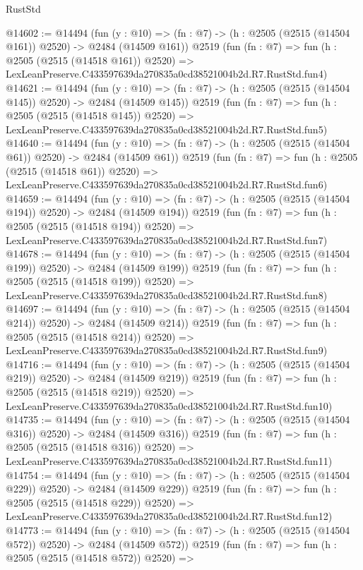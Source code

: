 \begin{lexlean}{RustStd}
\begin{coremodule}
@14602 := @14494
    (fun (y : @10) => (fn : @7) -> (h : @2505 (@2515 (@14504 @161)) @2520) -> @2484 (@14509 @161))
    @2519
    (fun (fn : @7) =>
    fun (h : @2505 (@2515 (@14518 @161)) @2520) =>
    LexLeanPreserve.C433597639da270835a0cd38521004b2d.R7.RustStd.fun4)
@14621 := @14494
    (fun (y : @10) => (fn : @7) -> (h : @2505 (@2515 (@14504 @145)) @2520) -> @2484 (@14509 @145))
    @2519
    (fun (fn : @7) =>
    fun (h : @2505 (@2515 (@14518 @145)) @2520) =>
    LexLeanPreserve.C433597639da270835a0cd38521004b2d.R7.RustStd.fun5)
@14640 := @14494
    (fun (y : @10) => (fn : @7) -> (h : @2505 (@2515 (@14504 @61)) @2520) -> @2484 (@14509 @61))
    @2519
    (fun (fn : @7) =>
    fun (h : @2505 (@2515 (@14518 @61)) @2520) =>
    LexLeanPreserve.C433597639da270835a0cd38521004b2d.R7.RustStd.fun6)
@14659 := @14494
    (fun (y : @10) => (fn : @7) -> (h : @2505 (@2515 (@14504 @194)) @2520) -> @2484 (@14509 @194))
    @2519
    (fun (fn : @7) =>
    fun (h : @2505 (@2515 (@14518 @194)) @2520) =>
    LexLeanPreserve.C433597639da270835a0cd38521004b2d.R7.RustStd.fun7)
@14678 := @14494
    (fun (y : @10) => (fn : @7) -> (h : @2505 (@2515 (@14504 @199)) @2520) -> @2484 (@14509 @199))
    @2519
    (fun (fn : @7) =>
    fun (h : @2505 (@2515 (@14518 @199)) @2520) =>
    LexLeanPreserve.C433597639da270835a0cd38521004b2d.R7.RustStd.fun8)
@14697 := @14494
    (fun (y : @10) => (fn : @7) -> (h : @2505 (@2515 (@14504 @214)) @2520) -> @2484 (@14509 @214))
    @2519
    (fun (fn : @7) =>
    fun (h : @2505 (@2515 (@14518 @214)) @2520) =>
    LexLeanPreserve.C433597639da270835a0cd38521004b2d.R7.RustStd.fun9)
@14716 := @14494
    (fun (y : @10) => (fn : @7) -> (h : @2505 (@2515 (@14504 @219)) @2520) -> @2484 (@14509 @219))
    @2519
    (fun (fn : @7) =>
    fun (h : @2505 (@2515 (@14518 @219)) @2520) =>
    LexLeanPreserve.C433597639da270835a0cd38521004b2d.R7.RustStd.fun10)
@14735 := @14494
    (fun (y : @10) => (fn : @7) -> (h : @2505 (@2515 (@14504 @316)) @2520) -> @2484 (@14509 @316))
    @2519
    (fun (fn : @7) =>
    fun (h : @2505 (@2515 (@14518 @316)) @2520) =>
    LexLeanPreserve.C433597639da270835a0cd38521004b2d.R7.RustStd.fun11)
@14754 := @14494
    (fun (y : @10) => (fn : @7) -> (h : @2505 (@2515 (@14504 @229)) @2520) -> @2484 (@14509 @229))
    @2519
    (fun (fn : @7) =>
    fun (h : @2505 (@2515 (@14518 @229)) @2520) =>
    LexLeanPreserve.C433597639da270835a0cd38521004b2d.R7.RustStd.fun12)
@14773 := @14494
    (fun (y : @10) => (fn : @7) -> (h : @2505 (@2515 (@14504 @572)) @2520) -> @2484 (@14509 @572))
    @2519
    (fun (fn : @7) =>
    fun (h : @2505 (@2515 (@14518 @572)) @2520) =>

\end{coremodule}
\end{lexlean}

